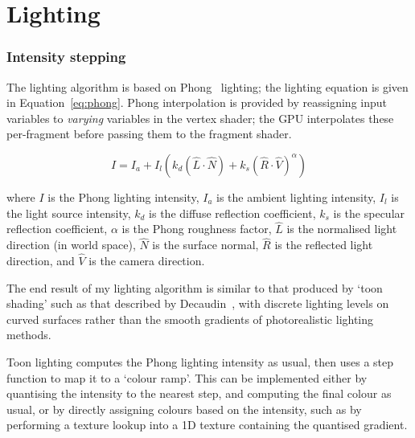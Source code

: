 \documentclass[12pt,twoside,notitlepage]{report}
\begin{document}
\section{Lighting}

\subsubsection{Intensity stepping}

The lighting algorithm is based on Phong~\cite{Phong:1975:ICG:360825.360839} lighting; the lighting equation is given in Equation~\ref{eq:phong}. Phong interpolation is provided by reassigning input variables to \textit{varying} variables in the vertex shader; the GPU interpolates these per-fragment before passing them to the fragment shader.

\begin{equation}\label{eq:phong}
I = I_{a} + I_{l}(k_{d}(\hat{L}\cdot \hat{N}) + k_{s}(\hat{R}\cdot \hat{V})^{\alpha})
\end{equation}

where $I$ is the Phong lighting intensity, $I_{a}$ is the ambient lighting intensity, $I_{l}$ is the light source intensity, $k_{d}$ is the diffuse reflection coefficient, $k_{s}$ is the specular reflection coefficient, $\alpha$ is the Phong roughness factor, $\hat{L}$ is the normalised light direction (in world space), $\hat{N}$ is the surface normal, $\hat{R}$ is the reflected light direction, and $\hat{V}$ is the camera direction.

The end result of my lighting algorithm is similar to that produced by `toon shading' such as that described by Decaudin~\cite{Decaudin:1996:CLR}, with discrete lighting levels on curved surfaces rather than the smooth gradients of photorealistic lighting methods.

Toon lighting computes the Phong lighting intensity as usual, then uses a step function to map it to a `colour ramp'. This can be implemented either by quantising the intensity to the nearest step, and computing the final colour as usual, or by directly assigning colours based on the intensity, such as by performing a texture lookup into a 1D texture containing the quantised gradient.
\end{document}
